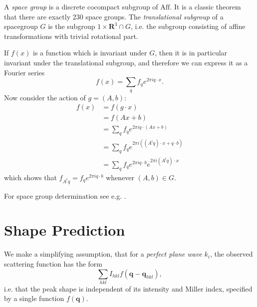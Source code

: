 \documentclass[twocolumn,preprintnumbers,amsmath,amssymb]{revtex4}
\newcommand{\bq}{\mathbf{q}}
\newcommand{\Aff}{\mathrm{Aff}}
\begin{document}
A \emph{space group} is a discrete cocompact subgroup of $\Aff$. It is a classic theorem that there are exactly 230 space groups.
The \emph{translational subgroup} of a spacegroup $G$ is the subgroup ${1} \times \mathbf{R}^3 \cap G$, i.e. the subgroup consisting of
affine transformations with trivial rotational part.

If $f(x)$ is a function which is invariant under $G$, then it
is in particular invariant under the translational subgroup, and therefore we can express it as a Fourier series
\begin{equation} f(x) = \sum_q f_q e^{2\pi i q \cdot x}. \end{equation}
Now consider the action of $g = (A,b)$:
\begin{align}
  f(x)
  &= f(g\cdot x) \\
  &= f(Ax + b) \\
  &= \sum_q f_q e^{2\pi i q \cdot (Ax + b)} \\
  &= \sum_q f_q e^{2\pi i ((A^t q) \cdot x + q \cdot b)} \\
  &= \sum_q f_q e^{2 \pi i q \cdot b} e^{2\pi i (A^t q) \cdot x}
\end{align}
which shows that $f_{A^t q} = f_{q} e^{2 \pi i q \cdot b}$ whenever $(A,b) \in G$.


For space group determination see e.g. \cite{Eva11,Kab10b}.


\section{Shape Prediction} \label{peak-prediction}
We make a simplifying assumption, that for a \emph{perfect plane wave} $k_i$, the observed scattering function has the form
\begin{equation} \sum_{hkl} I_{hkl} f(\bq - \bq_{hkl}), \end{equation}
i.e. that the peak shape is independent of its intensity and Miller index, specified by a single function $f(\bq)$.
\end{document}
